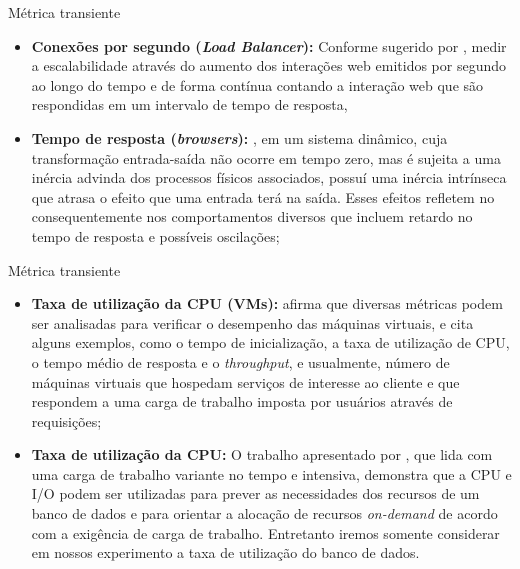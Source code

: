 \begin{frame}{Métrica transiente}
	\begin{itemize}
		\item \textbf{Conexões por segundo (\textit{Load Balancer}):} Conforme sugerido por \cite{Binnig2009}, medir a escalabilidade através do aumento dos interações web emitidos por segundo ao longo do tempo e de forma contínua contando a interação web que são respondidas em um intervalo de tempo de resposta,
		
		\item \textbf{Tempo de resposta (\textit{browsers}):} \cite{helder2014}, em um sistema dinâmico, cuja transformação entrada-saída não ocorre em tempo zero, mas é sujeita a uma inércia advinda dos processos físicos associados, possuí uma inércia intrínseca que atrasa o efeito que uma entrada terá na saída. Esses efeitos refletem no consequentemente nos comportamentos diversos que incluem retardo no tempo de resposta e possíveis oscilações; 	
	
	\end{itemize}
\end{frame}

\begin{frame}{Métrica transiente}
	\begin{itemize}
		\item \textbf{Taxa de utilização da CPU (VMs):} \cite{Nobile2013} afirma que diversas métricas podem ser analisadas para verificar o desempenho das máquinas virtuais, e cita alguns exemplos, como o tempo de inicialização, a taxa de utilização de CPU, o tempo médio de resposta e o \textit{throughput}, e usualmente, número de máquinas virtuais que hospedam serviços de interesse ao cliente e que respondem a uma carga de trabalho imposta por usuários através de requisições;
		
		\item \textbf{Taxa de utilização da CPU:} O trabalho apresentado por \cite{wang2009}, que lida com uma carga de trabalho variante no tempo e intensiva, demonstra que a CPU e I/O podem ser utilizadas para prever as necessidades dos recursos de um banco de dados e para orientar a alocação de recursos \textit{on-demand} de acordo com a exigência de carga de trabalho. Entretanto iremos somente considerar em nossos experimento a taxa de utilização do banco de dados.
	\end{itemize}
\end{frame}

